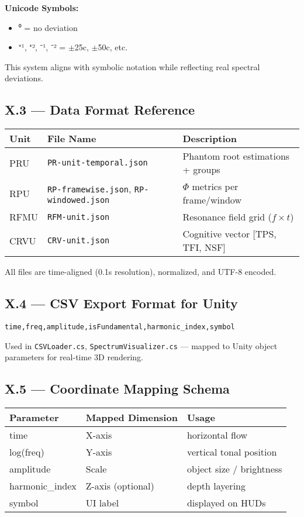 \textbf{Unicode Symbols:}
\begin{itemize}
    \item ⁰ = no deviation
    \item ⁺¹, ⁺², ⁻¹, ⁻² = $\pm$25c, $\pm$50c, etc.
\end{itemize}

This system aligns with symbolic notation while reflecting real spectral deviations.

\subsection*{X.3 — Data Format Reference}

\begin{center}
\begin{tabular}{|l|l|p{7.5cm}|}
\hline
\textbf{Unit} & \textbf{File Name} & \textbf{Description} \\
\hline
PRU & \texttt{PR-unit-temporal.json} & Phantom root estimations + groups \\
RPU & \texttt{RP-framewise.json}, \texttt{RP-windowed.json} & $\Phi$ metrics per frame/window \\
RFMU & \texttt{RFM-unit.json} & Resonance field grid ($f \times t$) \\
CRVU & \texttt{CRV-unit.json} & Cognitive vector [TPS, TFI, NSF] \\
\hline
\end{tabular}
\end{center}

All files are time-aligned (0.1s resolution), normalized, and UTF-8 encoded.

\subsection*{X.4 — CSV Export Format for Unity}

\begin{verbatim}
time,freq,amplitude,isFundamental,harmonic_index,symbol
\end{verbatim}

Used in \texttt{CSVLoader.cs}, \texttt{SpectrumVisualizer.cs} — mapped to Unity object parameters for real-time 3D rendering.

\subsection*{X.5 — Coordinate Mapping Schema}

\begin{center}
\begin{tabular}{|l|l|l|}
\hline
\textbf{Parameter} & \textbf{Mapped Dimension} & \textbf{Usage} \\
\hline
time & X-axis & horizontal flow \\
log(freq) & Y-axis & vertical tonal position \\
amplitude & Scale & object size / brightness \\
harmonic\_index & Z-axis (optional) & depth layering \\
symbol & UI label & displayed on HUDs \\
\hline
\end{tabular}
\end{center}

